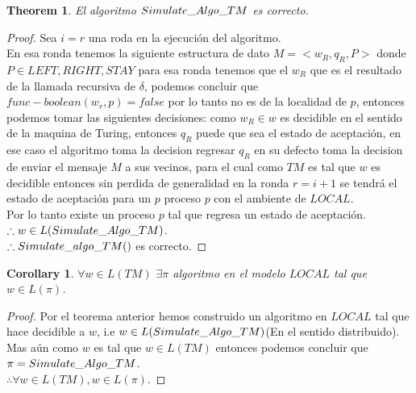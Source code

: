 \documentclass[10pt]{article}
\newtheorem*{corrolary}{Corollary}
\newtheorem{theorem}{Theorem}[section]
\begin{document}
    \begin{theorem}
        El algoritmo $Simulate\char95 Algo\char95 TM$ es correcto.
    \end{theorem}
    \begin{proof}
        Sea $i=r$ una roda en la ejecución del algoritmo.\\
        En esa ronda tenemos la siguiente estructura de dato $M = <w_{R}, q_{R}, P>$ donde
        $P\in {LEFT,RIGHT,STAY}$ para esa ronda tenemos que el $w_{R}$ que es el resultado de la
        llamada recursiva de $\delta$, podemos concluir que $func-boolean(w_{r},p) = false $
        por lo tanto no es de la localidad de $p$, entonces podemos tomar las siguientes decisiones:
        como $w_{R}\in w$ es decidible en el sentido de la maquina de Turing, entonces $q_{R}$ puede que
        sea el estado de aceptación, en ese caso el algoritmo toma la decision regresar $q_{R}$ en su defecto
        toma la decision de enviar el mensaje $M$ a sus vecinos,
        para el cual como $TM$ es tal que $w$ es decidible entonces sin perdida de generalidad en la ronda $r=i+1$ se tendrá el estado de aceptación
        para un $p$ proceso $p$ con el ambiente de $LOCAL$.\\
        Por lo tanto existe un proceso $p$ tal que regresa un estado de aceptación.\\
        $\therefore w \in L(Simulate\char95 Algo\char95 TM)$.\\
        $\therefore Simulate\char95 algo\char95 TM()$ es correcto.
    \end{proof}

    \begin{corrolary}
        $\forall w \in L(TM)$ $\exists \pi$ algoritmo en el modelo $LOCAL$ tal que
        $w\in L(\pi)$.
    \end{corrolary}
    \begin{proof}
        Por el teorema anterior hemos construido un algoritmo en $LOCAL$ tal que
        hace decidible a $w$, i.e $w \in L(Simulate\char95 Algo\char95 TM)$(En el sentido distribuido).\\
        Mas aún como $w$ es tal que $w \in L(TM)$ entonces podemos concluir que $\pi = Simulate\char95 Algo\char95 TM$.\\
        $ \therefore \forall w \in L(TM), w\in L(\pi)$.
    \end{proof}
\end{document}

